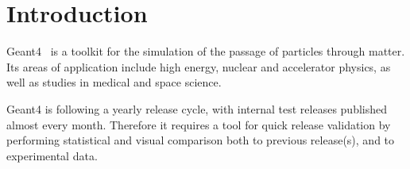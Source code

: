 \section{Introduction}
\label{sec-introduction}
Geant4~\cite{Geant4} is a toolkit for the simulation of the passage of particles through matter. Its areas of application include high energy, nuclear and accelerator physics, as well as studies in medical and space science. 

Geant4 is following a yearly release cycle, with internal test releases published almost every month.
Therefore it requires a tool for quick release validation by performing statistical and visual comparison both to previous release(s), and to experimental data. 
%

